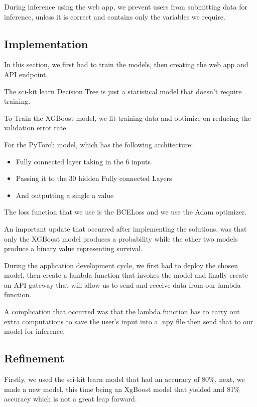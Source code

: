 \documentclass{article}
\begin{document}
During inference using the web app, we prevent users from submitting data for inference,
unless it is correct and contains only the variables we require.

\subsection{Implementation}\label{implementation}

In this section, we first had to train the models, then creating the web app and API endpoint.

The sci-kit learn Decision Tree is just a statistical model that doesn't require training.

To Train the XGBoost model, we fit training data and optimize on 
reducing the validation error rate.

For the PyTorch model, which has the following architecture:
\begin{itemize}
    \item Fully connected layer taking in the 6 inputs
    \item Passing it to the 30 hidden Fully connected Layers
    \item And outputting a single a value
\end{itemize}
The loss function that we use is the BCELoss and we use the Adam optimizer.

An important update that occurred after implementing the solutions, was
that only the XGBoost model produces a probability while the other two models 
produce a binary value representing survival.

During the application development cycle, we first had to deploy the chosen model,
then create a lambda function that invokes the model and finally create an API gateway
that will allow us to send and receive data from our lambda function.

A complication that occurred was that the lambda function has to carry out 
extra computations to save the user's input into a .npy file then send that 
to our model for inference.

\subsection{Refinement}\label{refinement}

Firstly, we used the sci-kit learn model that had an accuracy of 80\%,
next, we made a new model, this time being an XgBoost model that yielded 
and 81\% accuracy which is not a great leap forward.
\end{document}
